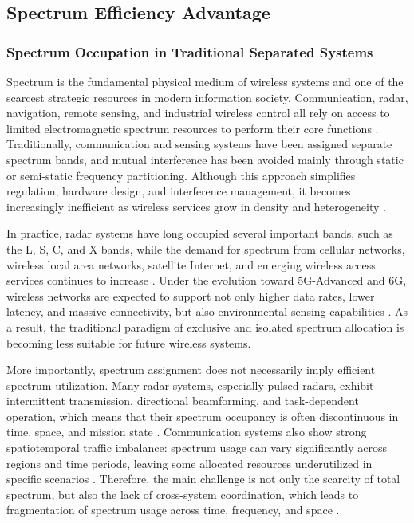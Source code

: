 \subsection{Spectrum Efficiency Advantage}
\label{subsec:ch1-isac-core-value-spectrum}
\subsubsection{Spectrum Occupation in Traditional Separated Systems}
\label{subsubsec:ch1-isac-core-value-spectrum-occupation}

Spectrum is the fundamental physical medium of wireless systems and one of the scarcest strategic resources in modern information society. Communication, radar, navigation, remote sensing, and industrial wireless control all rely on access to limited electromagnetic spectrum resources to perform their core functions \cite{Goldsmith2005}. Traditionally, communication and sensing systems have been assigned separate spectrum bands, and mutual interference has been avoided mainly through static or semi-static frequency partitioning. Although this approach simplifies regulation, hardware design, and interference management, it becomes increasingly inefficient as wireless services grow in density and heterogeneity \cite{Gonzalez2024integrated}.

In practice, radar systems have long occupied several important bands, such as the L, S, C, and X bands, while the demand for spectrum from cellular networks, wireless local area networks, satellite Internet, and emerging wireless access services continues to increase \cite{SkolnikRadarBook}. Under the evolution toward 5G-Advanced and 6G, wireless networks are expected to support not only higher data rates, lower latency, and massive connectivity, but also environmental sensing capabilities \cite{Liu2022ISAC,Saad2020Vision6G,IMT2030Framework}. As a result, the traditional paradigm of exclusive and isolated spectrum allocation is becoming less suitable for future wireless systems.

More importantly, spectrum assignment does not necessarily imply efficient spectrum utilization. Many radar systems, especially pulsed radars, exhibit intermittent transmission, directional beamforming, and task-dependent operation, which means that their spectrum occupancy is often discontinuous in time, space, and mission state \cite{SkolnikRadarBook}. Communication systems also show strong spatiotemporal traffic imbalance: spectrum usage can vary significantly across regions and time periods, leaving some allocated resources underutilized in specific scenarios \cite{Haykin2005CognitiveRadio}. Therefore, the main challenge is not only the scarcity of total spectrum, but also the lack of cross-system coordination, which leads to fragmentation of spectrum usage across time, frequency, and space \cite{Liu2020JointRadarComm,Liu2022ISAC}.

